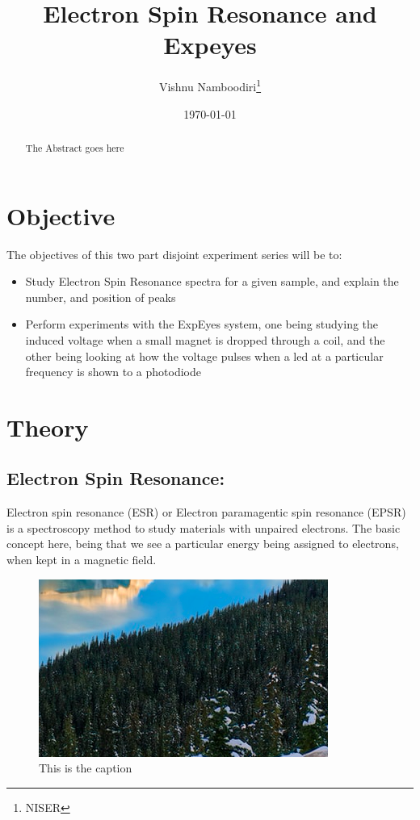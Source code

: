 \documentclass{double}
\begin{document}
\title{Electron Spin Resonance and Expeyes}
\author{Vishnu Namboodiri\thanks{NISER}}
\date{\today}
\maketitle
    \begin{abstract}

The Abstract goes here


\end{abstract}

\section{Objective}

The objectives of this two part disjoint experiment series will be to:  

\begin{itemize}
	\item Study Electron Spin Resonance spectra for a given sample, and explain the number, and position of peaks
	\item Perform experiments with the ExpEyes system, one being studying the induced voltage when a small magnet is dropped through a coil, and the other being looking at how the voltage pulses when a led at a particular frequency is shown to a photodiode
\end{itemize}

\section{Theory}
\subsection{Electron Spin Resonance:}
Electron spin resonance (ESR) or Electron paramagentic spin resonance (EPSR) is a spectroscopy method to study materials with unpaired electrons. The basic concept here, being that we see a particular energy being assigned to electrons, when kept in a magnetic field.

\begin{figure}[H]
    \includegraphics[width = \columnwidth]{image.png}
    \centering
    \caption{This is the caption}
    \label{f:image}
\end{figure}
            
\end{document}
